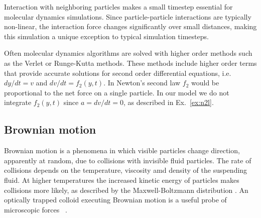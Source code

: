 \documentclass[twocolumn,preprintnumbers,amsmath,amssymb,aps,prx]{revtex4}
\begin{document}
  Interaction with neighboring particles
  makes a small timestep essential for molecular dynamics simulations.
  Since particle-particle interactions are typically non-linear,
  the interaction force changes significantly over small distances,
  making this simulation a unique
  exception to typical simulation timesteps.

  Often molecular dynamics algorithms 
  are solved with higher order methods
  such as the Verlet or Runge-Kutta methods.
  These methods include  higher order terms
  that provide accurate solutions for
  second order differential equations,
  i.e. $dy/dt = v$ and $dv/dt = f_2(y,t)$.
  In Newton's second law $f_2$ would be proportional
  to the net force on a single particle.
  In our model 
  we do not integrate $f_2(y,t)$ since 
  $a = dv/dt = 0$,
  as described in Ex.~\ref{ex:n2l}.
  \subsection{Brownian motion}
  \label{ex:brownian}
  Brownian motion is a phenomena in which 
  visible particles change direction,
  apparently at random, 
  due to collisions with invisible fluid particles.
  The rate of collisions depends on the temperature, viscosity
  amd density of 
  the suspending fluid.
  At higher temperatures
  the increased kinetic energy of particles
  makes collisions more likely, 
  as described by the Maxwell-Boltzmann distribution \cite{Einstein1905}.
  An optically trapped colloid executing Brownian motion
  is a useful probe of microscopic forces ~\cite{Volpe2013}.
  
\end{document}
